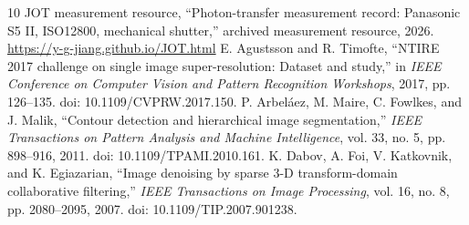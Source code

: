 \documentclass[10pt,twocolumn,journal]{IEEEtran}
\begin{document}
\begin{thebibliography}{10}
 JOT measurement resource, ``Photon-transfer measurement record: Panasonic S5 II, ISO12800, mechanical shutter,'' archived measurement resource, 2026. \url{https://y-g-jiang.github.io/JOT.html}
 E. Agustsson and R. Timofte, ``NTIRE 2017 challenge on single image super-resolution: Dataset and study,'' in \emph{IEEE Conference on Computer Vision and Pattern Recognition Workshops}, 2017, pp. 126--135. doi: 10.1109/CVPRW.2017.150.
 P. Arbeláez, M. Maire, C. Fowlkes, and J. Malik, ``Contour detection and hierarchical image segmentation,'' \emph{IEEE Transactions on Pattern Analysis and Machine Intelligence}, vol. 33, no. 5, pp. 898--916, 2011. doi: 10.1109/TPAMI.2010.161.
 K. Dabov, A. Foi, V. Katkovnik, and K. Egiazarian, ``Image denoising by sparse 3-D transform-domain collaborative filtering,'' \emph{IEEE Transactions on Image Processing}, vol. 16, no. 8, pp. 2080--2095, 2007. doi: 10.1109/TIP.2007.901238.
\end{thebibliography}
\end{document}
